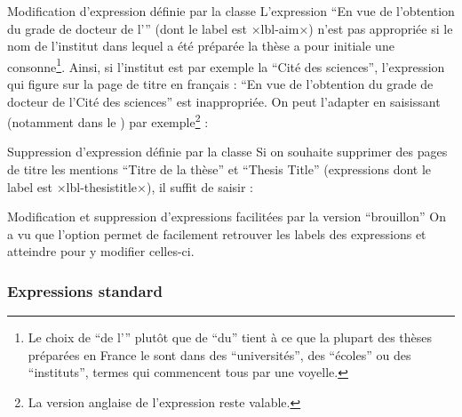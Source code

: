 \begin{dbexample}{Modification d'expression définie par la classe}{}
  L'expression \enquote{En vue de l'obtention du grade de docteur de l'} (dont
  le label est ×lbl-aim×) n'est pas appropriée si le nom de l'institut dans
  lequel a été préparée la thèse a pour initiale une consonne\footnote{Le choix
    de \enquote{de l'} plutôt que de \enquote{du} tient à ce que la plupart des
    thèses préparées en France le sont dans des \enquote{universités}, des
    \enquote{écoles} ou des \enquote{instituts}, termes qui commencent tous par
    une voyelle.}. Ainsi, si l'institut est par exemple la \enquote{Cité des
    sciences}, l'expression qui figure sur la page de titre en français :
  \enquote{En vue de l'obtention du grade de docteur de l'Cité des sciences}
  est inappropriée. On peut l'adapter en saisissant (notamment dans le
  \File{\configurationfile}) par exemple\footnote{La version anglaise de
    l'expression reste valable.} :
\begin{preamblecode}[title=Par exemple dans le \File{\configurationfile}]
\end{preamblecode}
\end{dbexample}
%
\begin{dbexample}{Suppression d'expression définie par la classe}{}
  Si on souhaite supprimer des pages de titre les mentions \enquote{Titre de la
    thèse} et \foreignquote{english}{Thesis Title} (expressions dont le label
  est ×lbl-thesistitle×), il suffit de saisir :
\begin{preamblecode}[title=Par exemple dans le \File{\configurationfile}]
\end{preamblecode}
\end{dbexample}

\begin{dbremark}{Modification et suppression d'expressions facilitées par la
    version \enquote{brouillon}}{}
  On a vu que l'option  permet de facilement retrouver les labels
  des expressions et atteindre \file{\configurationfile} pour y modifier
  celles-ci.
\end{dbremark}

\subsubsection{Expressions standard}
\label{sec:expressions-standard}


